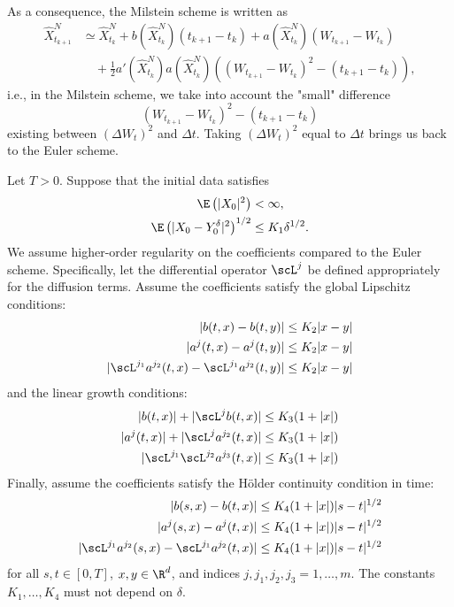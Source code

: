 As a consequence, the Milstein scheme is written as
\begin{align*}
    \hat{X}_{t_{k+1}}^N &\simeq \hat{X}_{t_k}^N + b(\hat{X}_{t_k}^N)(t_{k+1} - t_k) + a(\hat{X}_{t_k}^N)(W_{t_{k+1}} - W_{t_k}) \\
    &\quad + \frac{1}{2} a' (\hat{X}_{t_k}^N)a(\hat{X}_{t_k}^N)((W_{t_{k+1}} - W_{t_k})^2 - (t_{k+1} - t_k)),
\end{align*}
i.e., in the Milstein scheme, we take into account the "small" difference
\begin{equation*}
    (W_{t_{k+1}} - W_{t_k})^2 - (t_{k+1} - t_k)
\end{equation*}
existing between $(\Delta W_t)^2$ and $\Delta t$. Taking $(\Delta W_t)^2$ equal to $\Delta t$ brings us back to the Euler scheme.

Let $T > 0$. Suppose that the initial data satisfies
\begin{align}
    \E \left(|X_0|^2\right) &< \infty, \label{eq:MilsteinInitialMoment} \\
    \E \left(|X_0 - Y^\delta_0|^2\right)^{1/2} &\leq K_1 \delta^{1/2}. \label{eq:MilsteinInitialError}
\end{align}
We assume higher-order regularity on the coefficients compared to the Euler scheme. Specifically, let the differential operator $\scL^j$ be defined appropriately for the diffusion terms. Assume the coefficients satisfy the global Lipschitz conditions:
\begin{align}
    |b(t, x) - b(t, y)| &\leq K_2 |x - y| \notag \\
    |a^j(t, x) - a^j(t, y)| &\leq K_2 |x - y| \label{eq:MilsteinLipschitz} \\
    |\scL^{j_1} a^{j_2}(t, x) - \scL^{j_1} a^{j_2}(t, y)| &\leq K_2 |x - y| \notag
\end{align}
and the linear growth conditions:
\begin{align}
    |b(t, x)| + |\scL^j b(t, x)| &\leq K_3 (1 + |x|) \notag \\
    |a^j(t, x)| + |\scL^j a^{j_2}(t, x)| &\leq K_3 (1 + |x|) \label{eq:MilsteinLinearGrowth} \\
    |\scL^{j_1} \scL^{j_2} a^{j_3}(t, x)| &\leq K_3 (1 + |x|) \notag
\end{align}
Finally, assume the coefficients satisfy the H\"older continuity condition in time:
\begin{align}
    |b(s, x) - b(t, x)| &\leq K_4 (1 + |x|) |s - t|^{1/2} \notag \\
    |a^j(s, x) - a^j(t, x)| &\leq K_4 (1 + |x|) |s - t|^{1/2} \label{eq:MilsteinHolder} \\
    |\scL^{j_1} a^{j_2}(s, x) - \scL^{j_1} a^{j_2}(t, x)| &\leq K_4 (1 + |x|) |s - t|^{1/2} \notag
\end{align}
for all $s, t \in [0, T]$, $x, y \in \R^d$, and indices $j, j_1, j_2, j_3 = 1, \dots, m$. The constants $K_1, \dots, K_4$ must not depend on $\delta$.


